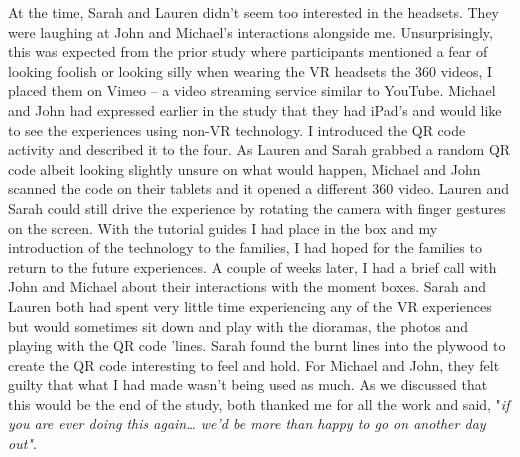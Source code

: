 At the time, Sarah and Lauren didn't seem too interested in the headsets. They were laughing at John and Michael's interactions alongside me. Unsurprisingly, this was expected from the prior study where participants mentioned a fear of looking foolish or looking silly when wearing the VR headsets \citep{hodge_exploring_2018} the 360 videos, I placed them on Vimeo – a video streaming service similar to YouTube. Michael and John had expressed earlier in the study that they had iPad's and would like to see the experiences using non-VR technology. I introduced the QR code activity and described it to the four. As Lauren and Sarah grabbed a random QR code albeit looking slightly unsure on what would happen, Michael and John scanned the code on their tablets and it opened a different 360 video. Lauren and Sarah could still drive the experience by rotating the camera with finger gestures on the screen. With the tutorial guides I had place in the box and my introduction of the technology to the families, I had hoped for the families to return to the future experiences. A couple of weeks later, I had a brief call with John and Michael about their interactions with the moment boxes. Sarah and Lauren both had spent very little time experiencing any of the VR experiences but would sometimes sit down and play with the dioramas, the photos and playing with the QR code 'lines. Sarah found the burnt lines into the plywood to create the QR code interesting to feel and hold. For Michael and John, they felt guilty that what I had made wasn't being used as much. As we discussed that this would be the end of the study, both thanked me for all the work and said, "\textit{if you are ever doing this again… we'd be more than happy to go on another day out"}.


